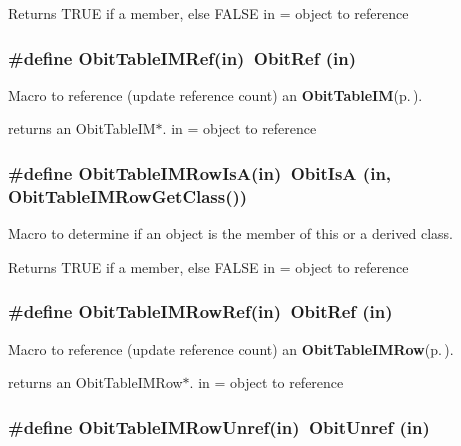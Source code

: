 Returns TRUE if a member, else FALSE in = object to reference 
\subsubsection{\setlength{\rightskip}{0pt plus 5cm}\#define Obit\-Table\-IMRef(in)\ Obit\-Ref (in)}\label{ObitTableIM_8h_a2}


Macro to reference (update reference count) an {\bf Obit\-Table\-IM}{\rm (p.\,\pageref{structObitTableIM})}. 

returns an Obit\-Table\-IM$\ast$. in = object to reference 
\subsubsection{\setlength{\rightskip}{0pt plus 5cm}\#define Obit\-Table\-IMRow\-Is\-A(in)\ Obit\-Is\-A (in, Obit\-Table\-IMRow\-Get\-Class())}\label{ObitTableIM_8h_a6}


Macro to determine if an object is the member of this or a derived class. 

Returns TRUE if a member, else FALSE in = object to reference 
\subsubsection{\setlength{\rightskip}{0pt plus 5cm}\#define Obit\-Table\-IMRow\-Ref(in)\ Obit\-Ref (in)}\label{ObitTableIM_8h_a5}


Macro to reference (update reference count) an {\bf Obit\-Table\-IMRow}{\rm (p.\,\pageref{structObitTableIMRow})}. 

returns an Obit\-Table\-IMRow$\ast$. in = object to reference 
\subsubsection{\setlength{\rightskip}{0pt plus 5cm}\#define Obit\-Table\-IMRow\-Unref(in)\ Obit\-Unref (in)}\label{ObitTableIM_8h_a4}


